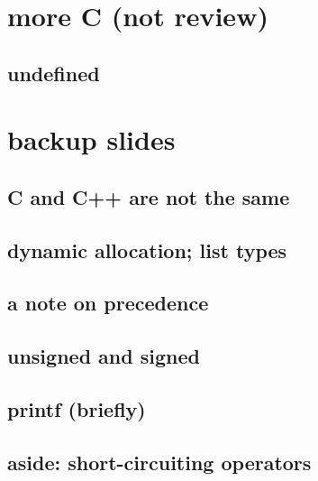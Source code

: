

\section{more C (not review)}

\subsection{undefined}



\section{backup slides}

\subsection{C and C++ are not the same}



\subsection{dynamic allocation; list types}



\subsection{a note on precedence}



\subsection{unsigned and signed}



\subsection{printf (briefly)}



\subsection{aside: short-circuiting operators}




